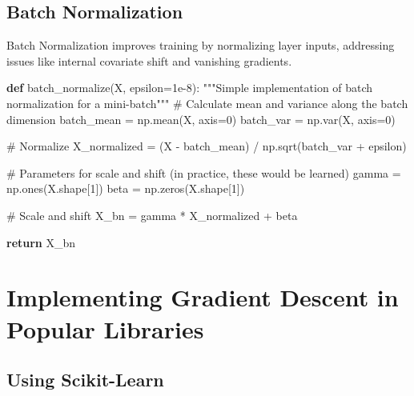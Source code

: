 \documentclass[
  letterpaper,
  DIV=11,
  numbers=noendperiod]{scrreprt}
\newenvironment{Shaded}{\begin{snugshade}}{\end{snugshade}}
\newcommand{\CommentTok}[1]{\textcolor[rgb]{0.37,0.37,0.37}{#1}}
\newcommand{\ControlFlowTok}[1]{\textcolor[rgb]{0.00,0.23,0.31}{\textbf{#1}}}
\newcommand{\DecValTok}[1]{\textcolor[rgb]{0.68,0.00,0.00}{#1}}
\newcommand{\FloatTok}[1]{\textcolor[rgb]{0.68,0.00,0.00}{#1}}
\newcommand{\KeywordTok}[1]{\textcolor[rgb]{0.00,0.23,0.31}{\textbf{#1}}}
\newcommand{\NormalTok}[1]{\textcolor[rgb]{0.00,0.23,0.31}{#1}}
\newcommand{\OperatorTok}[1]{\textcolor[rgb]{0.37,0.37,0.37}{#1}}
\begin{document}
\section{Batch Normalization}\label{batch-normalization}

Batch Normalization improves training by normalizing layer inputs,
addressing issues like internal covariate shift and vanishing gradients.

\begin{Shaded}
\begin{Highlighting}[]
\KeywordTok{def}\NormalTok{ batch\_normalize(X, epsilon}\OperatorTok{=}\FloatTok{1e{-}8}\NormalTok{):}
    \CommentTok{"""Simple implementation of batch normalization for a mini{-}batch"""}
    \CommentTok{\# Calculate mean and variance along the batch dimension}
\NormalTok{    batch\_mean }\OperatorTok{=}\NormalTok{ np.mean(X, axis}\OperatorTok{=}\DecValTok{0}\NormalTok{)}
\NormalTok{    batch\_var }\OperatorTok{=}\NormalTok{ np.var(X, axis}\OperatorTok{=}\DecValTok{0}\NormalTok{)}
    
    \CommentTok{\# Normalize}
\NormalTok{    X\_normalized }\OperatorTok{=}\NormalTok{ (X }\OperatorTok{{-}}\NormalTok{ batch\_mean) }\OperatorTok{/}\NormalTok{ np.sqrt(batch\_var }\OperatorTok{+}\NormalTok{ epsilon)}
    
    \CommentTok{\# Parameters for scale and shift (in practice, these would be learned)}
\NormalTok{    gamma }\OperatorTok{=}\NormalTok{ np.ones(X.shape[}\DecValTok{1}\NormalTok{])}
\NormalTok{    beta }\OperatorTok{=}\NormalTok{ np.zeros(X.shape[}\DecValTok{1}\NormalTok{])}
    
    \CommentTok{\# Scale and shift}
\NormalTok{    X\_bn }\OperatorTok{=}\NormalTok{ gamma }\OperatorTok{*}\NormalTok{ X\_normalized }\OperatorTok{+}\NormalTok{ beta}
    
    \ControlFlowTok{return}\NormalTok{ X\_bn}
\end{Highlighting}
\end{Shaded}


\chapter{Implementing Gradient Descent in Popular
Libraries}\label{implementing-gradient-descent-in-popular-libraries}

\section{Using Scikit-Learn}\label{using-scikit-learn}
\end{document}

